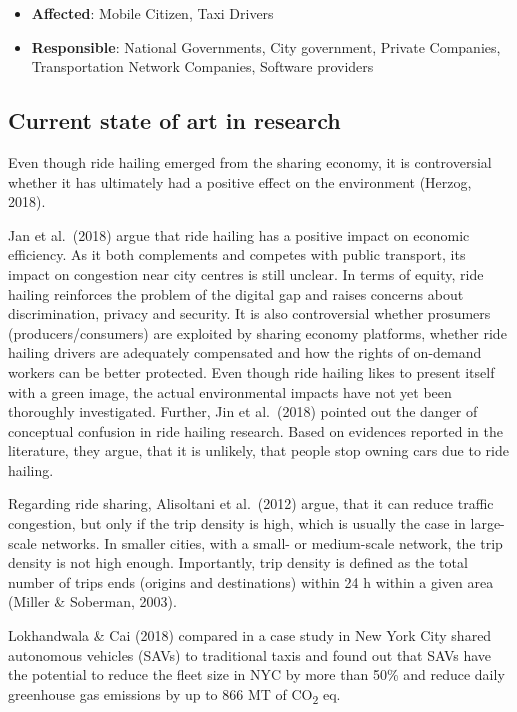 \documentclass[
]{book}
\providecommand{\tightlist}{%
  \setlength{\itemsep}{0pt}\setlength{\parskip}{0pt}}
\begin{document}
\begin{itemize}
\tightlist
\item
  \textbf{Affected}: Mobile Citizen, Taxi Drivers
\item
  \textbf{Responsible}: National Governments, City government, Private Companies, Transportation Network Companies, Software providers
\end{itemize}

\hypertarget{current-state-of-art-in-research-34}{%
\subsection*{Current state of art in research}\label{current-state-of-art-in-research-34}}

Even though ride hailing emerged from the sharing economy, it is controversial whether it has ultimately had a positive effect on the environment (Herzog, 2018).

Jan et al.~(2018) argue that ride hailing has a positive impact on economic efficiency. As it both complements and competes with public transport, its impact on congestion near city centres is still unclear. In terms of equity, ride hailing reinforces the problem of the digital gap and raises concerns about discrimination, privacy and security. It is also controversial whether prosumers (producers/consumers) are exploited by sharing economy platforms, whether ride hailing drivers are adequately compensated and how the rights of on-demand workers can be better protected. Even though ride hailing likes to present itself with a green image, the actual environmental impacts have not yet been thoroughly investigated. Further, Jin et al.~(2018) pointed out the danger of conceptual confusion in ride hailing research. Based on evidences reported in the literature, they argue, that it is unlikely, that people stop owning cars due to ride hailing.

Regarding ride sharing, Alisoltani et al.~(2012) argue, that it can reduce traffic congestion, but only if the trip density is high, which is usually the case in large-scale networks. In smaller cities, with a small- or medium-scale network, the trip density is not high enough. Importantly, trip density is defined as the total number of trips ends (origins and destinations) within 24 h within a given area (Miller \& Soberman, 2003).

Lokhandwala \& Cai (2018) compared in a case study in New York City shared autonomous vehicles (SAVs) to traditional taxis and found out that SAVs have the potential to reduce the fleet size in NYC by more than 50\% and reduce daily greenhouse gas emissions by up to 866 MT of CO\textsubscript{2} eq.
\end{document}
